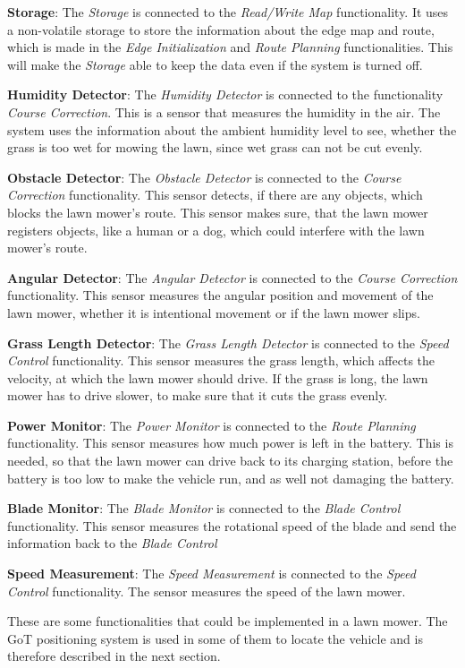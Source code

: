 \textbf{Storage}:
The \textit{Storage} is connected to the \textit{Read/Write Map} functionality. It uses a non-volatile storage to store the information about the edge map and route, which is made in the \textit{Edge Initialization} and \textit{Route Planning} functionalities. This will make the \textit{Storage} able to keep the data even if the system is turned off.

\textbf{Humidity Detector}:
The \textit{Humidity Detector} is connected to the functionality \textit{Course Correction}. This is a sensor that measures the humidity in the air. The system uses the information about the ambient humidity level to see, whether the grass is too wet for mowing the lawn, since wet grass can not be cut evenly. 

\textbf{Obstacle Detector}:
The \textit{Obstacle Detector} is connected to the \textit{Course Correction} functionality. This sensor detects, if there are any objects, which blocks the lawn mower's route. This sensor makes sure, that the lawn mower registers objects, like a human or a dog, which could interfere with the lawn mower's route.

\textbf{Angular Detector}:
The \textit{Angular Detector} is connected to the \textit{Course Correction} functionality. This sensor measures the angular position and movement of the lawn mower, whether it is intentional movement or if the lawn mower slips.

\textbf{Grass Length Detector}:
The \textit{Grass Length Detector} is connected to the \textit{Speed Control} functionality. This sensor measures the  grass length, which affects the velocity, at which the lawn mower should drive. If the grass is long, the lawn mower has to drive slower, to make sure that it cuts the grass evenly. 

\textbf{Power Monitor}:
The \textit{Power Monitor} is connected to the \textit{Route Planning} functionality. This sensor measures how much power is left in the battery. This is needed, so that the lawn mower can drive back to its charging station, before the battery is too low to make the vehicle run, and as well not damaging the battery.

\textbf{Blade Monitor}:
The \textit{Blade Monitor} is connected to the \textit{Blade Control} functionality. This sensor measures the rotational speed of the blade and send the information back to the \textit{Blade Control}

\textbf{Speed Measurement}:
The \textit{Speed Measurement} is connected to the \textit{Speed Control} functionality. The sensor measures the speed of the lawn mower.

These are some functionalities that could be implemented in a lawn mower. The GoT positioning system is used in some of them to locate the vehicle and is therefore described in the next section.
